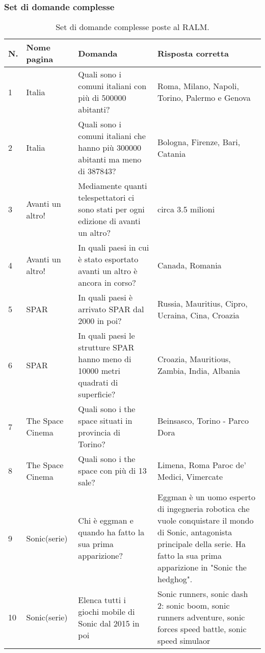 \subsubsection{Set di domande complesse}
\begin{table}[H]
    \centering
    \begin{tabular}{|p{0.5cm} |p{2.5cm} |p{4cm}| p{4.5cm}|}
        \hline
        \textbf{N}. & \textbf{Nome pagina} & \textbf{Domanda} & \textbf{Risposta corretta} \\
        \hline
        1 & Italia & Quali sono i comuni italiani con più di 500000 abitanti? & Roma, Milano, Napoli, Torino, Palermo e Genova \\
        \hline
        2 & Italia & Quali sono i comuni italiani che hanno più 300000 abitanti ma meno di 387843? & Bologna, Firenze, Bari, Catania \\
        \hline
        3 & Avanti un altro! & Mediamente quanti telespettatori ci sono stati per ogni edizione di avanti un altro? & circa 3.5 milioni \\
        \hline
        4 & Avanti un altro! & In quali paesi in cui è stato esportato avanti un altro è ancora in corso? & Canada, Romania \\
        \hline
        5 & SPAR & In quali paesi è arrivato SPAR dal 2000 in poi? & Russia, Mauritius, Cipro, Ucraina, Cina, Croazia \\
        \hline
        6 & SPAR & In quali paesi le strutture SPAR hanno meno di 10000 metri quadrati di superficie? & Croazia, Mauritious, Zambia,  India, Albania \\
        \hline
        7 & The Space Cinema & Quali sono i the space situati in provincia di Torino? & Beinsasco, Torino - Parco Dora \\
        \hline
        8 & The Space Cinema & Quali sono i the space con più di 13 sale? & Limena, Roma Paroc de' Medici,  Vimercate \\
        \hline
        9 & Sonic(serie) & Chi è eggman e quando ha fatto la sua prima apparizione? & Eggman è un uomo esperto di ingegneria robotica che vuole conquistare il mondo di Sonic, antagonista principale della serie. Ha fatto la sua prima apparizione in "Sonic the hedghog". \\
        \hline
        10 & Sonic(serie) & Elenca tutti i giochi mobile di Sonic dal 2015 in poi & Sonic runners, sonic dash 2: sonic boom, sonic runners adventure, sonic forces speed battle, sonic speed simulaor \\
        \hline
    \end{tabular}
    \caption{Set di domande complesse poste al RALM.}
\end{table}

